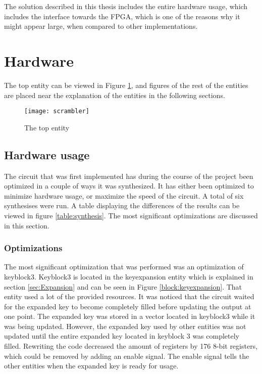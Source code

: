 The solution described in this thesis includes the entire hardware 
usage, which includes the interface towards the FPGA, which is one of 
the reasons why it might appear large, when compared to other 
implementations.

\section{Hardware}
The top entity can be viewed in Figure \ref{b:scr}, and figures of the 
rest of the entities are placed near the explanation of the entities 
in the following sections.

\begin{figure}
  \texttt{[image: scrambler]}
  \caption{The top entity}
  \label{b:scr}
\end{figure}

\subsection{Hardware usage}
The circuit that was first implemented has during the course of the 
project been optimized in a couple of ways it was synthesized. 
It has either been optimized to minimize hardware usage, or maximize 
the speed of the circuit. A total of six synthesises were run. A 
table displaying the differences of the results can be viewed in 
figure \ref{table:synthesis}.
The most significant optimizations are discussed in this section. 

\subsubsection{Optimizations}
The most significant optimization that was performed was an 
optimization of keyblock3. Keyblock3 is located in the keyexpansion 
entity which is explained in section \ref{sec:Expansion} and can be 
seen in Figure \ref{block:keyexpansion}. That entity used a lot of 
the provided resources. It was noticed that the circuit waited for 
the expanded key to become completely filled before updating the 
output at one point. The expanded key was stored in a vector located 
in keyblock3 while it was being updated. However, the expanded key 
used by other entities was not updated until the entire expanded key 
located in keyblock 3 was completely filled. Rewriting the code 
decreased the amount of registers by 176 8-bit registers, which could 
be removed by adding an enable signal. The enable signal tells the 
other entities when the expanded key is ready for usage.

